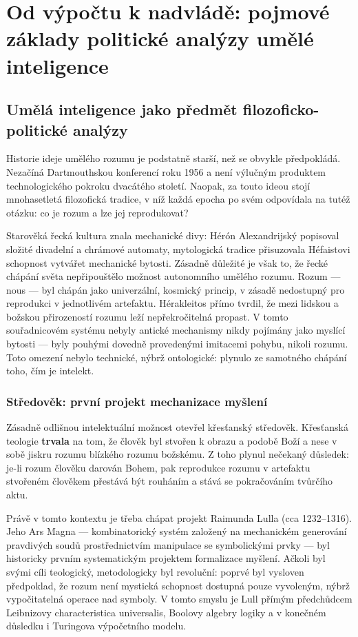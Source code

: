 \chapter{Od výpočtu k nadvládě: pojmové základy politické analýzy umělé inteligence}
\section{Umělá inteligence jako předmět filozoficko-politické analýzy}
Historie ideje umělého rozumu je podstatně starší, než se obvykle předpokládá.
Nezačíná Dartmouthskou konferencí roku 1956 a není výlučným produktem technologického pokroku dvacátého století.
Naopak, za touto ideou stojí mnohasetletá filozofická tradice, v níž každá epocha po svém odpovídala na tutéž otázku:
co je rozum a lze jej reprodukovat?

Starověká řecká kultura znala mechanické divy: Hérón Alexandrijský popisoval složité divadelní a chrámové automaty,
mytologická tradice přisuzovala Héfaistovi schopnost vytvářet mechanické bytosti.
Zásadně důležité je však to, že řecké chápání světa nepřipouštělo možnost autonomního umělého rozumu.
Rozum — nous — byl chápán jako univerzální, kosmický princip, v zásadě nedostupný pro reprodukci v jednotlivém artefaktu.
Hérakleitos přímo tvrdil, že mezi lidskou a božskou přirozeností rozumu leží nepřekročitelná propast.
V tomto souřadnicovém systému nebyly antické mechanismy nikdy pojímány jako myslící bytosti
— byly pouhými dovedně provedenými imitacemi pohybu, nikoli rozumu.
Toto omezení nebylo technické, nýbrž ontologické: plynulo ze samotného chápání toho, čím je intelekt.

\subsection{Středověk: první projekt mechanizace myšlení}

Zásadně odlišnou intelektuální možnost otevřel křesťanský středověk.
Křesťanská teologie \textbf{trvala} na tom, že člověk byl stvořen k obrazu a podobě Boží a nese v sobě jiskru rozumu blízkého rozumu božskému.
Z toho plynul nečekaný důsledek: je-li rozum člověku darován Bohem, pak reprodukce rozumu v artefaktu stvořeném člověkem přestává být rouháním a stává se pokračováním tvůrčího aktu.

Právě v tomto kontextu je třeba chápat projekt Raimunda Lulla (cca 1232–1316).
Jeho Ars Magna — kombinatorický systém založený na mechanickém generování pravdivých soudů prostřednictvím manipulace se symbolickými prvky — byl historicky prvním systematickým projektem formalizace myšlení.
Ačkoli byl svými cíli teologický, metodologicky byl revoluční: poprvé byl vysloven předpoklad, že rozum není mystická schopnost dostupná pouze vyvoleným, nýbrž vypočitatelná operace nad symboly.
V tomto smyslu je Lull přímým předchůdcem Leibnizovy characteristica universalis, Boolovy algebry logiky a v konečném důsledku i Turingova výpočetního modelu.

